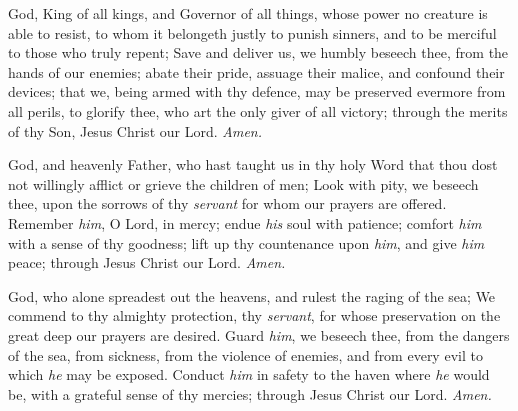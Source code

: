  God, King of all kings, and Governor of all things, whose power no creature is able to resist, to whom it belongeth justly to punish sinners, and to be merciful to those who truly repent; Save and deliver us, we humbly beseech thee, from the hands of our enemies; abate their pride, assuage their malice, and confound their devices; that we, being armed with thy defence, may be preserved evermore from all perils, to glorify thee, who art the only giver of all victory; through the merits of thy Son, Jesus Christ our Lord. \textit{Amen.}

 God, and heavenly Father, who hast taught us in thy holy Word that thou dost not willingly afflict or grieve the children of men; Look with pity, we beseech thee, upon the sorrows of thy \textit{servant} for whom our prayers are offered. Remember \textit{him}, O Lord, in mercy; endue \textit{his} soul with patience; comfort \textit{him} with a sense of thy goodness; lift up thy countenance upon \textit{him}, and give \textit{him} peace; through Jesus Christ our Lord. \textit{Amen.}

 God, who alone spreadest out the heavens, and rulest the raging of the sea; We commend to thy almighty protection, thy \textit{servant}, for whose preservation on the great deep our prayers are desired. Guard \textit{him}, we beseech thee, from the dangers of the sea, from sickness, from the violence of enemies, and from every evil to which \textit{he} may be exposed. Conduct \textit{him} in safety to the haven where \textit{he} would be, with a grateful sense of thy mercies; through Jesus Christ our Lord. \textit{Amen.}

